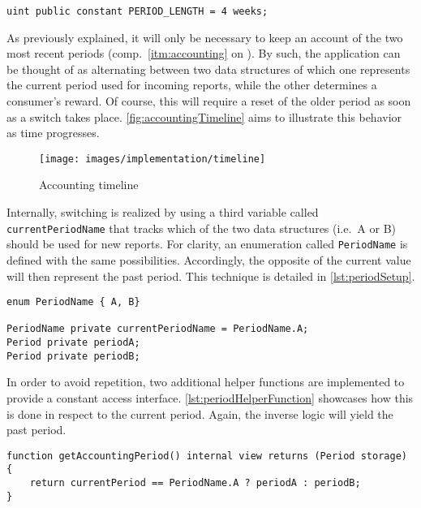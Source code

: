 \begin{lstlisting}[caption=Definition of period length, label=lst:periodLength]
uint public constant PERIOD_LENGTH = 4 weeks;
\end{lstlisting}

As previously explained, it will only be necessary to keep an account of the two most recent periods (comp.~\ref{itm:accounting} on ). By such, the application can be thought of as alternating between two data structures of which one represents the current period used for incoming reports, while the other determines a consumer's reward. Of course, this will require a reset of the older period as soon as a switch takes place. \autoref{fig:accountingTimeline} aims to illustrate this behavior as time progresses. 

\begin{figure}[hbt]
	  \texttt{[image: images/implementation/timeline]}
	  \caption{Accounting timeline}
	  \label{fig:accountingTimeline}
\end{figure}

\FloatBarrier

Internally, switching is realized by using a third variable called \texttt{currentPeriodName} that tracks which of the two data structures (i.e.~A or B) should be used for new reports. For clarity, an enumeration called \texttt{PeriodName} is defined with the same possibilities. Accordingly, the opposite of the current value will then represent the past period. This technique is detailed in \autoref{lst:periodSetup}. 

\begin{lstlisting}[language=Solidity, caption=Declaration of periods and definition of current period tracker, label=lst:periodSetup]
enum PeriodName { A, B}

PeriodName private currentPeriodName = PeriodName.A;
Period private periodA;
Period private periodB;
\end{lstlisting}

In order to avoid repetition, two additional helper functions are implemented to provide a constant access interface.  \autoref{lst:periodHelperFunction} showcases how this is done in respect to the current period. Again, the inverse logic will yield the past period. 

\begin{lstlisting}[language=Solidity, caption=Helper function to retrieve current period, label=lst:periodHelperFunction]
function getAccountingPeriod() internal view returns (Period storage) {
	return currentPeriod == PeriodName.A ? periodA : periodB;
}
\end{lstlisting}
 
